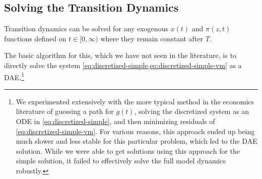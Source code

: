\documentclass[11pt]{article}
\begin{document}
\subsection{Solving the Transition Dynamics}

Transition dynamics can be solved for any exogenous $x(t)$ and $\pi(z,t)$ functions defined on $t \in [0,\infty)$ where they remain constant after $T$.

The basic algorithm for this, which we have not seen in the literature, is to directly solve the system \cref{eq:discretized-simple,eq:discretized-simple-vm} as a DAE.\footnote{ We experimented extensively with the more typical method in the economics literature of guessing a path for $g(t)$, solving the discretized system as an ODE in \cref{eq:discretized-simple}, and then minimizing residuals of \cref{eq:discretized-simple-vm}.  For various reasons, this approach ended up being much slower and less stable for this particular problem, which led to the DAE solution.  While we were able to get solutions using this approach for the simple solution, it failed to effectively solve the full model dynamics robustly.}
\end{document}
